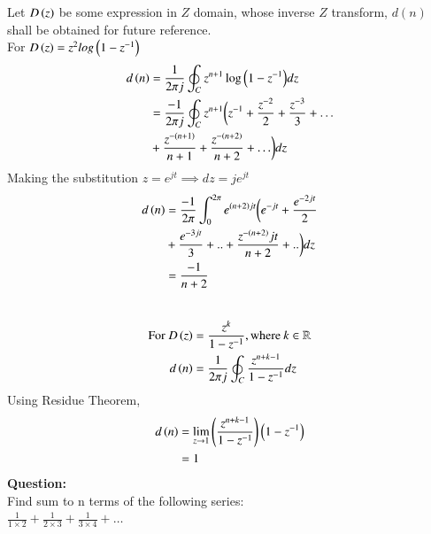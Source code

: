 \documentclass[journal,12pt,twocolumn]{IEEEtran}
\theoremstyle{remark}
\begin{document}
Let $D\left(z\right)$ be some expression in $Z$ domain, whose inverse $Z$ transform, $d(n)$ shall be obtained for future reference.\\
For $D\left(z\right)= z^{2}log\left(1-z^{-1}\right)$
\begin{align}
    d\left(n\right)&= \frac{1}{2\pi j} \oint _C z^{n+1}\log{\ensuremath{\left(1-z^{-1}\right)}}dz\\
    &=\frac{-1}{2\pi j} \oint _C z^{n+1}\biggl(z^{-1}+\frac{z^{-2}}{2} + \frac{z^{-3}}{3}+\ldots \notag\\ \;\: &+ \frac{z^{-(n+1)}}{n+1} +  \frac{z^{-\left(n+2\right)}}{n+2}+ \ldots \biggr) dz\\ 
\end{align}
Making the substitution $z=e^{jt} \implies dz = je^{jt}$
\begin{align}  
    d\left(n\right)&=\frac{-1}{2\pi} \int_{0}^{2\pi} e^{\left(n+2\right)jt}\biggl(e^{-jt}+\frac{e^{-2jt}}{2} \notag \\&+ \frac{e^{-3jt}}{3} +.. +\frac{z^{-\left(n+2\right)}jt}{n+2}+..\biggr) dz\\
    &=\frac{-1}{n+2}\label{11027_eq2}
\end{align}
\\
\begin{align}
    \notag \text{For }D\left(z\right)&= \frac{z^k}{1-z^{-1}},\text{where} \: k \in \mathbb{R}\\
    d\left(n\right)&=\frac{1}{2\pi j} \oint _C \frac{z^{n+k-1}}{1-z^{-1}}dz
\end{align}
Using Residue Theorem,
\begin{align}
    d\left(n\right)&= \lim_{z \to 1}\left(\frac{z^{n+k-1}}{1-z^{-1}}\right)\left({1-z^{-1}}\right) \\
    &= 1\label{11027_eq3}
\end{align}
\newpage
\textbf{Question:} \\
Find sum to n terms of the following series:\\
$\frac{1}{1 \times 2} + \frac{1}{2 \times 3} + \frac{1}{3 \times 4} + \ldots$
\bigskip \bigskip
\end{document}
